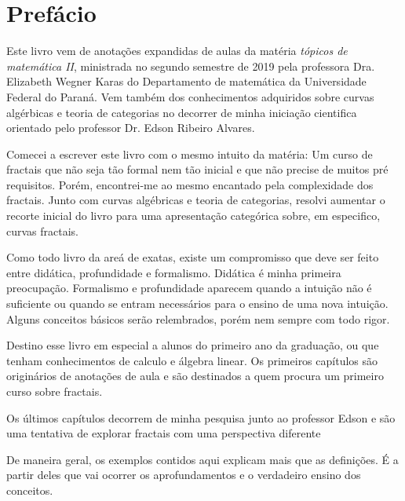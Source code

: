 \chapter*{Prefácio}\label{pre}

Este livro vem de anotações expandidas de aulas da matéria \textit{tópicos de matemática II}, ministrada no segundo semestre de 2019 pela professora Dra. Elizabeth Wegner Karas do Departamento de matemática da Universidade Federal do Paraná. Vem também dos conhecimentos adquiridos sobre curvas algérbicas e teoria de categorias no decorrer de minha iniciação cientifica orientado pelo professor Dr. Edson Ribeiro Alvares. 

Comecei a escrever este livro com o mesmo intuito da matéria: Um curso de fractais que não seja tão formal nem tão inicial e que não precise de muitos pré requisitos. Porém, encontrei-me ao mesmo encantado pela complexidade dos fractais. Junto com curvas algébricas e teoria de categorias, resolvi aumentar o recorte inicial do livro para uma apresentação categórica sobre, em especifico, curvas fractais.

Como todo livro da areá de exatas, existe um compromisso que deve ser feito entre didática, profundidade e formalismo. Didática é minha primeira preocupação. Formalismo e profundidade aparecem quando a intuição não é suficiente ou quando se entram necessários para o ensino de uma nova intuição. Alguns conceitos básicos serão relembrados, porém nem sempre com todo rigor.

Destino esse livro em especial a alunos do primeiro ano da graduação, ou que tenham conhecimentos de calculo e álgebra linear. Os primeiros capítulos são originários de anotações de aula e são destinados a quem procura um primeiro curso sobre fractais.

Os últimos capítulos decorrem de minha pesquisa junto ao professor Edson e são uma tentativa de explorar fractais com uma perspectiva diferente

De maneira geral, os exemplos contidos aqui explicam mais que as definições. É a partir deles que vai ocorrer os aprofundamentos e o verdadeiro ensino dos conceitos. 